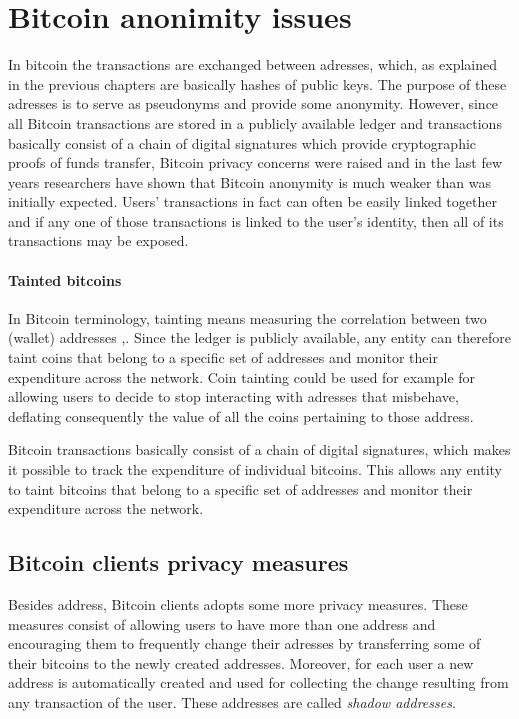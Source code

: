 \section{Bitcoin anonimity issues} In bitcoin the transactions are exchanged
between adresses, which, as explained in  the previous chapters are basically
hashes of public keys. The purpose of these adresses is to serve as pseudonyms
and provide some anonymity. However, since all Bitcoin transactions are stored
in a publicly available ledger and transactions basically consist of a chain of
digital signatures which provide cryptographic proofs of funds transfer, Bitcoin
privacy concerns were raised and in the last few years researchers have shown
that Bitcoin anonymity is much weaker than was initially expected. Users’
transactions in fact can often be easily linked together and if any one of those
transactions is linked to the user’s identity, then all of its transactions may
be exposed.


\paragraph{Tainted bitcoins} In Bitcoin terminology, tainting means measuring
the correlation between two (wallet) addresses
\cite{karame2016bitcoin},\cite{guthm_2016}. Since the ledger is publicly
available, any entity can therefore taint coins that belong to a specific set of
addresses and monitor their expenditure across the network. Coin tainting could
be used for example for allowing users to decide to stop interacting with
adresses that misbehave, deflating consequently the value of all the coins
pertaining to those address.



Bitcoin transactions basically consist of a chain
of digital signatures, which makes it possible to track the expenditure of
individual bitcoins. This allows any entity to taint bitcoins that belong to a
specific set of addresses and monitor their expenditure across the network.




\subsection{Bitcoin clients privacy measures} Besides address, Bitcoin clients
adopts some more privacy measures. These measures consist of allowing users to
have more than one address and encouraging them to frequently change their
adresses by transferring some of their bitcoins to the newly created addresses.
Moreover, for each user a new address is automatically created and used for
collecting the change resulting from any transaction of the user. These
addresses are called \emph{shadow addresses}.






